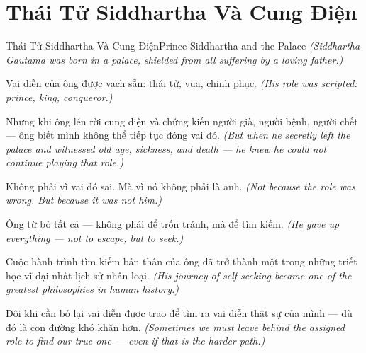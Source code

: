 \section{Thái Tử Siddhartha Và Cung Điện}
\begin{truyen}{Thái Tử Siddhartha Và Cung Điện}{Prince Siddhartha and the Palace}
\textit{(Siddhartha Gautama was born in a palace, shielded from all suffering by a loving father.)}

Vai diễn của ông được vạch sẵn: thái tử, vua, chinh phục.
\textit{(His role was scripted: prince, king, conqueror.)}

Nhưng khi ông lén rời cung điện và chứng kiến người già, người bệnh, người chết — ông biết mình không thể tiếp tục đóng vai đó.
\textit{(But when he secretly left the palace and witnessed old age, sickness, and death — he knew he could not continue playing that role.)}

Không phải vì vai đó sai. Mà vì nó không phải là anh.
\textit{(Not because the role was wrong. But because it was not him.)}

Ông từ bỏ tất cả — không phải để trốn tránh, mà để tìm kiếm.
\textit{(He gave up everything — not to escape, but to seek.)}

Cuộc hành trình tìm kiếm bản thân của ông đã trở thành một trong những triết học vĩ đại nhất lịch sử nhân loại.
\textit{(His journey of self-seeking became one of the greatest philosophies in human history.)}

\end{truyen}

\begin{baihoc}
Đôi khi cần bỏ lại vai diễn được trao để tìm ra vai diễn thật sự của mình — dù đó là con đường khó khăn hơn.
\textit{(Sometimes we must leave behind the assigned role to find our true one — even if that is the harder path.)}
\end{baihoc}
\ngancach

